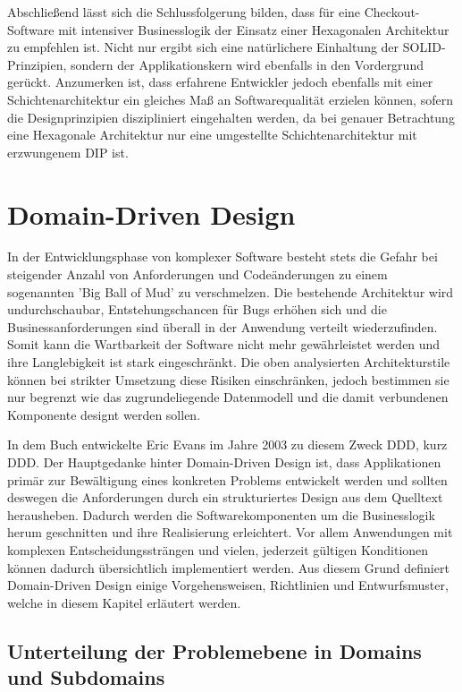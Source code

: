 Abschließend lässt sich die Schlussfolgerung bilden, dass für eine Checkout-Software mit intensiver Businesslogik der Einsatz einer Hexagonalen Architektur zu empfehlen ist. Nicht nur ergibt sich eine natürlichere Einhaltung der SOLID-Prinzipien, sondern der Applikationskern wird ebenfalls in den Vordergrund gerückt. Anzumerken ist, dass erfahrene Entwickler jedoch ebenfalls mit einer Schichtenarchitektur ein gleiches Maß an Softwarequalität erzielen können, sofern die Designprinzipien diszipliniert eingehalten werden, da bei genauer Betrachtung eine Hexagonale Architektur nur eine umgestellte Schichtenarchitektur mit erzwungenem \acrlong{DIP} ist. 

\section{Domain-Driven Design}

In der Entwicklungsphase von komplexer Software besteht stets die Gefahr bei steigender Anzahl von Anforderungen und Codeänderungen zu einem sogenannten 'Big Ball of Mud' zu verschmelzen. Die bestehende Architektur wird undurchschaubar, Entstehungschancen für Bugs erhöhen sich und die Businessanforderungen sind überall in der Anwendung verteilt wiederzufinden. Somit kann die Wartbarkeit der Software nicht mehr gewährleistet werden und ihre Langlebigkeit ist stark eingeschränkt. Die oben analysierten Architekturstile können bei strikter Umsetzung diese Risiken einschränken, jedoch bestimmen sie nur begrenzt wie das zugrundeliegende Datenmodell und die damit verbundenen Komponente designt werden sollen. 

In dem Buch  entwickelte Eric Evans im Jahre 2003 zu diesem Zweck \acrlong{DDD}, kurz \acrshort{DDD}. Der Hauptgedanke hinter Domain-Driven Design ist, dass Applikationen primär zur Bewältigung eines konkreten Problems entwickelt werden und sollten deswegen die Anforderungen durch ein strukturiertes Design aus dem Quelltext herausheben. Dadurch werden die Softwarekomponenten um die Businesslogik herum geschnitten und ihre Realisierung erleichtert. Vor allem Anwendungen mit komplexen Entscheidungssträngen und vielen, jederzeit gültigen Konditionen können dadurch übersichtlich implementiert werden. Aus diesem Grund definiert Domain-Driven Design einige Vorgehensweisen, Richtlinien und Entwurfsmuster, welche in diesem Kapitel erläutert werden. 

\subsection{Unterteilung der Problemebene in Domains und Subdomains}


